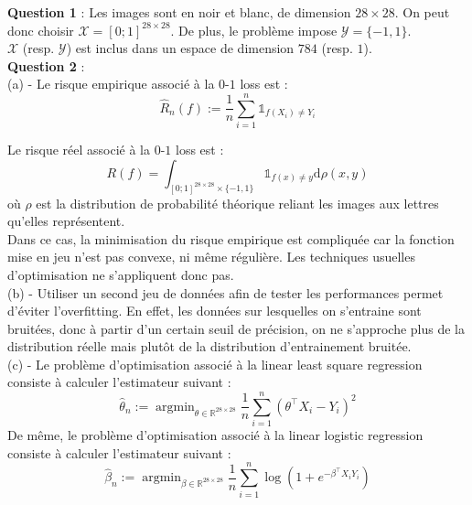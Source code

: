 \documentclass[11pt,a4paper]{article}
\DeclareMathOperator*{\argmin}{arg\min}
\begin{document}
\textbf{Question 1} : Les images sont en noir et blanc, de dimension $28 \times 28$. On peut donc choisir $\mathcal{X}=[0;1]^{28\times 28}$. De plus, le problème impose $\mathcal{Y}=\{-1,1\}$.\\ $\mathcal{X}$ (resp. $\mathcal{Y}$) est inclus dans un espace de dimension $784$ (resp. $1$). \\

\textbf{Question 2} : \\
 (a) - Le risque empirique associé à la $0$-$1$ loss est : \[\widehat{R}_n(f) := \frac{1}{n} \sum_{i=1}^n\mathds{1}_{f(X_i)\neq Y_i}\]

Le risque réel associé à la $0$-$1$ loss est : \[R(f) = \int_{[0;1]^{28\times 28} \times \{-1,1\}} \mathds{1}_{f(x)\neq y}\mathrm{d}\rho(x,y) \] où $\rho$ est la distribution de probabilité théorique reliant les images aux lettres qu'elles représentent. \\

Dans ce cas, la minimisation du risque empirique est compliquée car la fonction mise en jeu n'est pas convexe, ni même régulière. Les techniques usuelles d'optimisation ne s'appliquent donc pas. \\

(b) - Utiliser un second jeu de données afin de tester les performances permet d'éviter l'overfitting. En effet, les données sur lesquelles on s'entraine sont bruitées, donc à partir d'un certain seuil de précision, on ne s'approche plus de la distribution réelle mais plutôt de la distribution d'entrainement bruitée. \\

(c) - Le problème d'optimisation associé à la linear least square regression consiste à calculer l'estimateur suivant : \[\widehat{\theta}_n := \argmin_{\theta \in \mathbb{R}^{28\times 28}} \frac{1}{n}\sum_{i=1}^n(\theta^\top X_i-Y_i)^2\]
De même, le problème d'optimisation associé à la linear logistic regression consiste à calculer l'estimateur suivant :
\[\widehat{\beta}_n := \argmin_{\beta \in \mathbb{R}^{28\times 28}} \frac{1}{n}\sum_{i=1}^n \log(1 + e^{-\beta^\top X_i Y_i}) \]
\end{document}
